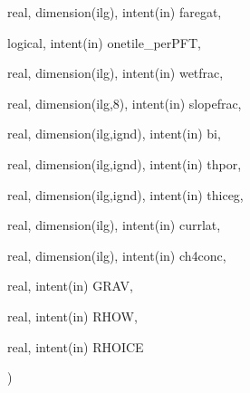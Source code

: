 {\begin{DoxyParamCaption}
\item[{real, dimension(ilg), intent(in)}]{faregat, }
\item[{logical, intent(in)}]{onetile\+\_\+per\+P\+F\+T, }
\item[{real, dimension(ilg), intent(in)}]{wetfrac, }
\item[{real, dimension(ilg,8), intent(in)}]{slopefrac, }
\item[{real, dimension(ilg,ignd), intent(in)}]{bi, }
\item[{real, dimension(ilg,ignd), intent(in)}]{thpor, }
\item[{real, dimension(ilg,ignd), intent(in)}]{thiceg, }
\item[{real, dimension(ilg), intent(in)}]{currlat, }
\item[{real, dimension(ilg), intent(in)}]{ch4conc, }
\item[{real, intent(in)}]{G\+R\+A\+V, }
\item[{real, intent(in)}]{R\+H\+O\+W, }
\item[{real, intent(in)}]{R\+H\+O\+I\+C\+E}
\end{DoxyParamCaption}
)}\label{ctem_8f90_a2b6b15dcac84105200925dab9dfea7aa}

